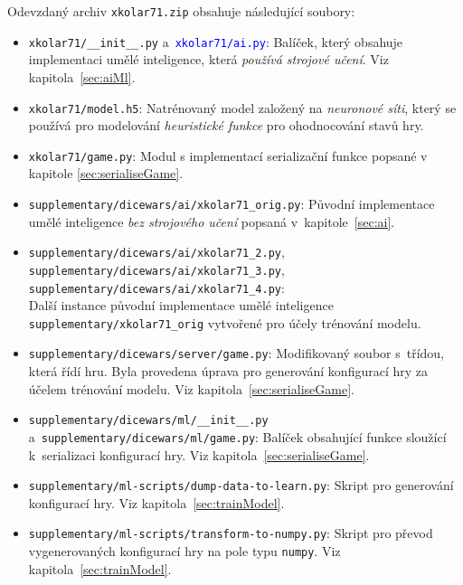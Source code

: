 \documentclass[11pt, a4paper]{article}
\theoremstyle{definition}
\begin{document}
Odevzdaný archiv \texttt{xkolar71.zip} obsahuje následující soubory:
\begin{itemize}
    \item
        \texttt{xkolar71/\_\_init\_\_.py}
        a~\textcolor{blue}{\texttt{xkolar71/ai.py}}: Balíček,
        který obsahuje implementaci umělé inteligence, která \emph{používá
        strojové učení}. Viz kapitola~\ref{sec:aiMl}.

    \item
        \texttt{xkolar71/model.h5}: Natrénovaný model založený
        na \emph{neuronové síti}, který se používá pro modelování
        \emph{heuristické funkce} pro ohodnocování stavů hry.
    
    
    \item
        \texttt{xkolar71/game.py}: Modul s implementací serializační
        funkce popsané v kapitole \ref{sec:serialiseGame}.

    \item
        \texttt{supplementary/dicewars/ai/xkolar71\_orig.py}: Původní implementace umělé
        inteligence \emph{bez strojového učení} popsaná
        v~kapitole~\ref{sec:ai}.

    \item
        \texttt{supplementary/dicewars/ai/xkolar71\_2.py},
        \texttt{supplementary/dicewars/ai/xkolar71\_3.py},
        \texttt{supplementary/dicewars/ai/xkolar71\_4.py}: \\
        Další instance původní implementace umělé inteligence
        \texttt{supplementary/xkolar71\_orig} vytvořené pro účely trénování modelu.

    \item
        \texttt{supplementary/dicewars/server/game.py}: Modifikovaný soubor s~třídou, která
        řídí hru. Byla provedena úprava pro generování konfigurací hry za
        účelem trénování modelu. Viz kapitola~\ref{sec:serialiseGame}.

    \item
        \texttt{supplementary/dicewars/ml/\_\_init\_\_.py} a~\texttt{supplementary/dicewars/ml/game.py}:
        Balíček obsahující funkce sloužící k~serializaci konfigurací hry.
        Viz kapitola~\ref{sec:serialiseGame}.

    \item
        \texttt{supplementary/ml-scripts/dump-data-to-learn.py}: Skript pro generování
        konfigurací hry. Viz kapitola~\ref{sec:trainModel}.

    \item
        \texttt{supplementary/ml-scripts/transform-to-numpy.py}: Skript pro převod
        vygenerovaných konfigurací hry na pole typu \texttt{numpy}. Viz
        kapitola~\ref{sec:trainModel}.


\end{itemize}
\end{document}
